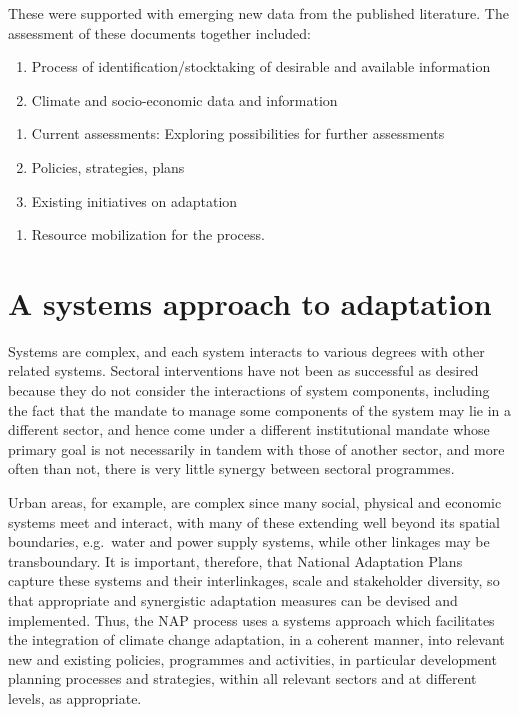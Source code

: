 \documentclass[
]{book}
\providecommand{\tightlist}{%
  \setlength{\itemsep}{0pt}\setlength{\parskip}{0pt}}
\begin{document}
These were supported with emerging new data from the published literature. The assessment of these documents together included:

\begin{enumerate}
\def\labelenumi{\alph{enumi}.}
\item
  Process of identification/stocktaking of desirable and available information
\item
  Climate and socio-economic data and information
\end{enumerate}

\begin{enumerate}
\def\labelenumi{\roman{enumi}.}
\setcounter{enumi}{1}
\tightlist
\item
  Current assessments: Exploring possibilities for further assessments
\item
  Policies, strategies, plans
\item
  Existing initiatives on adaptation
\end{enumerate}

\begin{enumerate}
\def\labelenumi{\alph{enumi}.}
\setcounter{enumi}{1}
\tightlist
\item
  Resource mobilization for the process.
\end{enumerate}

\hypertarget{a-systems-approach-to-adaptation}{%
\section{A systems approach to adaptation}\label{a-systems-approach-to-adaptation}}

Systems are complex, and each system interacts to various degrees with other related systems. Sectoral interventions have not been as successful as desired because they do not consider the interactions of system components, including the fact that the mandate to manage some components of the system may lie in a different sector, and hence come under a different institutional mandate whose primary goal is not necessarily in tandem with those of another sector, and more often than not, there is very little synergy between sectoral programmes.

Urban areas, for example, are complex since many social, physical and economic systems meet and interact, with many of these extending well beyond its spatial boundaries, e.g.~water and power supply systems, while other linkages may be transboundary. It is important, therefore, that National Adaptation Plans capture these systems and their interlinkages, scale and stakeholder diversity, so that appropriate and synergistic adaptation measures can be devised and implemented. Thus, the NAP process uses a systems approach which facilitates the integration of climate change adaptation, in a coherent manner, into relevant new and existing policies, programmes and activities, in particular development planning processes and strategies, within all relevant sectors and at different levels, as appropriate.
\end{document}
